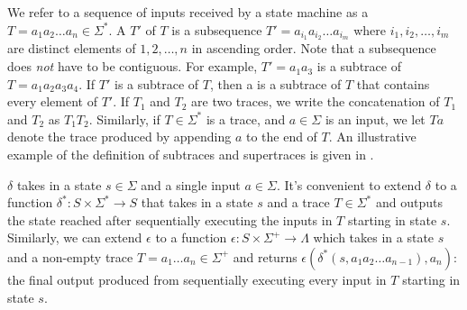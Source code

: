 We refer to a sequence of inputs received by a state machine as a
 $T = a_1 a_2 \ldots a_n \in \Sigma^*$. A 
$T'$ of $T$ is a subsequence $T' = a_{i_1} a_{i_2} \ldots a_{i_m}$ where $i_1,
i_2, \ldots, i_m$ are distinct elements of $1, 2, \ldots, n$ in ascending
order. Note that a subsequence does \emph{not} have to be contiguous. For
example, $T' = a_1 a_3$ is a subtrace of $T = a_1 a_2 a_3 a_4$. If $T'$ is a
subtrace of $T$, then a  is a subtrace of
$T$ that contains every element of $T'$. If $T_1$ and $T_2$ are two traces, we
write the concatenation of $T_1$ and $T_2$ as $T_1T_2$. Similarly, if $T \in
\Sigma^*$ is a trace, and $a \in \Sigma$ is an input, we let $Ta$ denote the
trace produced by appending $a$ to the end of $T$. An illustrative example of
the definition of subtraces and supertraces is given in .

{}

$\delta$ takes in a state $s \in \Sigma$ and a single input $a \in \Sigma$.
It's convenient to extend $\delta$ to a function $\delta^*: S \times \Sigma^*
\to S$ that takes in a state $s$ and a trace $T \in \Sigma^*$ and outputs the
state reached after sequentially executing the inputs in $T$ starting in state
$s$. Similarly, we can extend $\epsilon$ to a function $\epsilon: S \times
\Sigma^+ \to \Lambda$ which takes in a state $s$ and a non-empty trace $T = a_1
\ldots a_n \in \Sigma^+$ and returns $\epsilon(\delta^*(s, a_1 a_2 \ldots
a_{n-1}), a_n)$: the final output produced from sequentially executing every
input in $T$ starting in state $s$.
